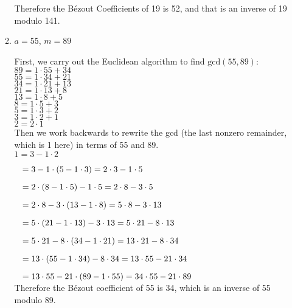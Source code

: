 \documentclass[11pt]{article}
\begin{document}
\begin{enumerate}[label=\textbf{\arabic*.}]
\begin{enumerate}[label=\textbf{\alph*)}]
		Therefore the B\'ezout Coefficients of 19 is 52, and that is an inverse of 19 modulo 141.
		
		\item $a = 55$, $m = 89$
		
		First, we carry out the Euclidean algorithm to find $\text{gcd}(55, 89)$: \\
		
		$89 = 1 \cdot 55 + 34$ \\
		$55 = 1 \cdot 34 + 21$ \\
		$34 = 1 \cdot 21 + 13$ \\
		$21 = 1 \cdot 13 + 8$ \\
		$13 = 1 \cdot 8 + 5$ \\
		$8 = 1 \cdot 5 + 3$ \\
		$5 = 1 \cdot 3 + 2$ \\
		$3 = 1 \cdot 2 + 1$ \\
		$2 = 2 \cdot 1$ \\
		
		Then we work backwards to rewrite the gcd (the last nonzero remainder, which is 1 here) in terms of 55 and 89. \\
		
		$1 = 3 - 1 \cdot 2$
		
		$\hspace{0.3cm} = 3 - 1 \cdot (5 - 1 \cdot 3) = 2 \cdot 3 - 1 \cdot 5$
		
		$\hspace{0.3cm} = 2 \cdot (8 - 1 \cdot 5) - 1 \cdot 5 = 2 \cdot 8 - 3 \cdot 5$
		
		$\hspace{0.3cm} = 2 \cdot 8 - 3 \cdot (13 - 1 \cdot 8) = 5 \cdot 8 - 3 \cdot 13$
		
		$\hspace{0.3cm} = 5 \cdot (21 - 1 \cdot 13) - 3 \cdot 13 = 5 \cdot 21 - 8 \cdot 13$
		
		$\hspace{0.3cm} = 5 \cdot 21 - 8 \cdot (34 - 1 \cdot 21) = 13 \cdot 21 - 8 \cdot 34$
		
		$\hspace{0.3cm} = 13 \cdot (55 - 1 \cdot 34) - 8 \cdot 34 = 13 \cdot 55 - 21 \cdot 34$
		
		$\hspace{0.3cm} = 13 \cdot 55 - 21 \cdot (89 - 1 \cdot 55) = 34 \cdot 55 - 21 \cdot 89$ \\
		
		Therefore the B\'ezout coefficient of 55 is 34, which is an inverse of 55 modulo 89.
		

\end{enumerate}
\end{enumerate}
\end{document}
